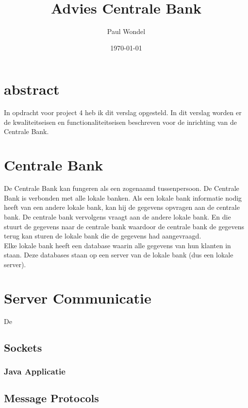 
\usepackage[dutch]{babel}



\title{Advies Centrale Bank}
\author{Paul Wondel}
\date{\today}
\maketitle

\section{abstract}
In opdracht voor project 4 heb ik dit verslag opgesteld.
In dit verslag worden er de kwaliteitseisen en functionaliteitseisen
beschreven voor de inrichting van de Centrale Bank.

\clearpage
\newpage

\section{Centrale Bank}
De Centrale Bank kan fungeren als een zogenaamd tussenpersoon.
De Centrale Bank is verbonden met alle lokale banken.
Als een lokale bank informatie nodig heeft van een andere lokale bank,
kan hij de gegevens opvragen aan de centrale bank.
De centrale bank vervolgens vraagt aan de andere lokale bank.
En die stuurt de gegevens naar de centrale bank waardoor de centrale bank
de gegevens terug kan sturen de lokale bank die de gegevens had aangevraagd.\\

Elke lokale bank heeft een database waarin alle gegevens van hun klanten in staan.
Deze databases staan op een server van de lokale bank (dus een lokale server).


\section{Server Communicatie}
De 

\subsection{Sockets}

\subsubsection{Java Applicatie}

\subsection{Message Protocols}

